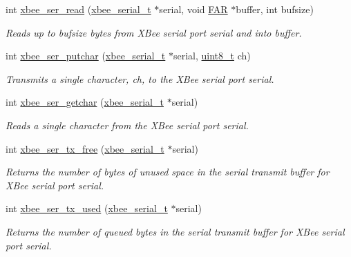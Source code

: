 \begin{DoxyCompactItemize}
int \hyperlink{group__hal__rabbit_ga8263312373c03a79a718142e051b3342}{xbee\-\_\-ser\-\_\-read} (\hyperlink{structxbee__serial__t}{xbee\-\_\-serial\-\_\-t} $\ast$serial, void \hyperlink{group__hal_gaef060b3456fdcc093a7210a762d5f2ed}{F\-A\-R} $\ast$buffer, int bufsize)
\begin{DoxyCompactList}\small\item\em Reads up to {\itshape bufsize} bytes from X\-Bee serial port {\itshape serial} and into {\itshape buffer}. \end{DoxyCompactList}\item 
int \hyperlink{group__hal__rabbit_ga86fea2345efb8bf9424228f0979b1849}{xbee\-\_\-ser\-\_\-putchar} (\hyperlink{structxbee__serial__t}{xbee\-\_\-serial\-\_\-t} $\ast$serial, \hyperlink{group__hal_gae1affc9ca37cfb624959c866a73f83c2}{uint8\-\_\-t} ch)
\begin{DoxyCompactList}\small\item\em Transmits a single character, {\itshape ch}, to the X\-Bee serial port {\itshape serial}. \end{DoxyCompactList}\item 
int \hyperlink{group__hal__rabbit_gaeeb38154313a44f86146cdcfe08e7d08}{xbee\-\_\-ser\-\_\-getchar} (\hyperlink{structxbee__serial__t}{xbee\-\_\-serial\-\_\-t} $\ast$serial)
\begin{DoxyCompactList}\small\item\em Reads a single character from the X\-Bee serial port {\itshape serial}. \end{DoxyCompactList}\item 
int \hyperlink{group__hal__rabbit_ga3ad8f378b572d6fec982f1086bd3b94f}{xbee\-\_\-ser\-\_\-tx\-\_\-free} (\hyperlink{structxbee__serial__t}{xbee\-\_\-serial\-\_\-t} $\ast$serial)
\begin{DoxyCompactList}\small\item\em Returns the number of bytes of unused space in the serial transmit buffer for X\-Bee serial port {\itshape serial}. \end{DoxyCompactList}\item 
int \hyperlink{group__hal__rabbit_gaabf70934d186354cde4ac14ed27d1bd2}{xbee\-\_\-ser\-\_\-tx\-\_\-used} (\hyperlink{structxbee__serial__t}{xbee\-\_\-serial\-\_\-t} $\ast$serial)
\begin{DoxyCompactList}\small\item\em Returns the number of queued bytes in the serial transmit buffer for X\-Bee serial port {\itshape serial}. \end{DoxyCompactList}\item 

\end{DoxyCompactItemize}
